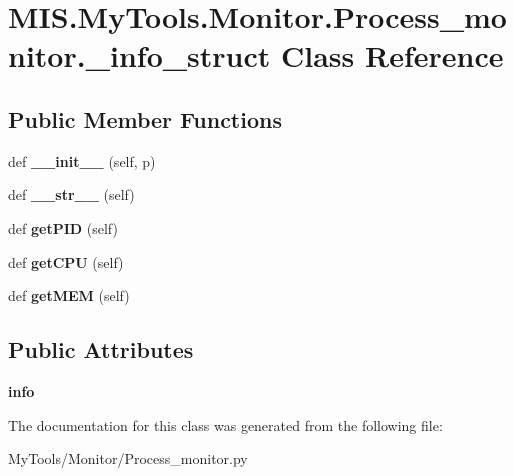 \hypertarget{classMIS_1_1MyTools_1_1Monitor_1_1Process__monitor_1_1__info__struct}{}\section{M\+I\+S.\+My\+Tools.\+Monitor.\+Process\+\_\+monitor.\+\_\+info\+\_\+struct Class Reference}
\label{classMIS_1_1MyTools_1_1Monitor_1_1Process__monitor_1_1__info__struct}
\subsection*{Public Member Functions}
\begin{DoxyCompactItemize}
\item 
\mbox{\label{classMIS_1_1MyTools_1_1Monitor_1_1Process__monitor_1_1__info__struct_adf7a41b1149cafb0e12c4636e7a59a6e}} 
def {\bfseries \+\_\+\+\_\+init\+\_\+\+\_\+} (self, p)
\item 
\mbox{\label{classMIS_1_1MyTools_1_1Monitor_1_1Process__monitor_1_1__info__struct_a534db3310e2f376b3b1bc9c53f1f4a62}} 
def {\bfseries \+\_\+\+\_\+str\+\_\+\+\_\+} (self)
\item 
\mbox{\label{classMIS_1_1MyTools_1_1Monitor_1_1Process__monitor_1_1__info__struct_a7acdf2611799a8313f4ff4bcd1a7147e}} 
def {\bfseries get\+P\+ID} (self)
\item 
\mbox{\label{classMIS_1_1MyTools_1_1Monitor_1_1Process__monitor_1_1__info__struct_a188b673a1070328b7e635570efc3cb01}} 
def {\bfseries get\+C\+PU} (self)
\item 
\mbox{\label{classMIS_1_1MyTools_1_1Monitor_1_1Process__monitor_1_1__info__struct_af7bd428fdea53ef3616b71d3888dde78}} 
def {\bfseries get\+M\+EM} (self)
\end{DoxyCompactItemize}
\subsection*{Public Attributes}
\begin{DoxyCompactItemize}
\item 
\mbox{\label{classMIS_1_1MyTools_1_1Monitor_1_1Process__monitor_1_1__info__struct_a96347160929b180cef75f84f8c649fe6}} 
{\bfseries info}
\end{DoxyCompactItemize}


The documentation for this class was generated from the following file\+:\begin{DoxyCompactItemize}
\item 
My\+Tools/\+Monitor/Process\+\_\+monitor.\+py\end{DoxyCompactItemize}
